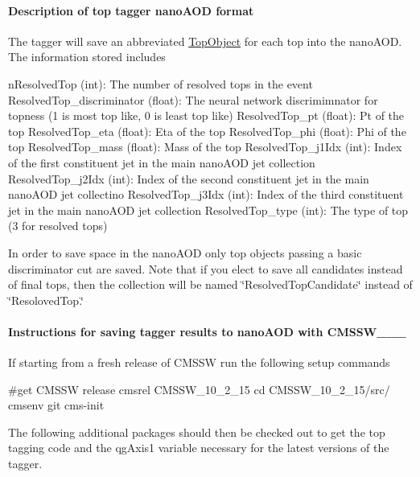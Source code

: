 \paragraph*{Description of top tagger nano\-A\-O\-D format}

The tagger will save an abbreviated \hyperlink{classTopObject}{Top\-Object} for each top into the nano\-A\-O\-D. The information stored includes


\begin{DoxyCode}
nResolvedTop (\textcolor{keywordtype}{int}): The number of resolved tops in the event
ResolvedTop\_discriminator (float): The neural network discrimimnator for topness (1 is most top like, 0 is 
      least top like)
ResolvedTop\_pt (float): Pt of the top
ResolvedTop\_eta (float): Eta of the top
ResolvedTop\_phi (float): Phi of the top
ResolvedTop\_mass (float): Mass of the top
ResolvedTop\_j1Idx (int): Index of the first constituent jet in the main nanoAOD jet collection
ResolvedTop\_j2Idx (int): Index of the second constituent jet in the main nanoAOD jet collectino
ResolvedTop\_j3Idx (int): Index of the third constituent jet in the main nanoAOD jet collection
ResolvedTop\_type (int): The type of top (3 for resolved tops)
\end{DoxyCode}


In order to save space in the nano\-A\-O\-D only top objects passing a basic discriminator cut are saved. Note that if you elect to save all candidates instead of final tops, then the collection will be named \char`\"{}\-Resolved\-Top\-Candidate\char`\"{} instead of \char`\"{}\-Resoloved\-Top.\char`\"{}

\paragraph*{Instructions for saving tagger results to nano\-A\-O\-D with C\-M\-S\-S\-W\-\_\-\_\-\_}

If starting from a fresh release of C\-M\-S\-S\-W run the following setup commands


\begin{DoxyCode}
\textcolor{preprocessor}{#get CMSSW release}
\textcolor{preprocessor}{}cmsrel CMSSW\_10\_2\_15
cd CMSSW\_10\_2\_15/src/
cmsenv
git cms-init
\end{DoxyCode}


The following additional packages should then be checked out to get the top tagging code and the qg\-Axis1 variable necessary for the latest versions of the tagger.


